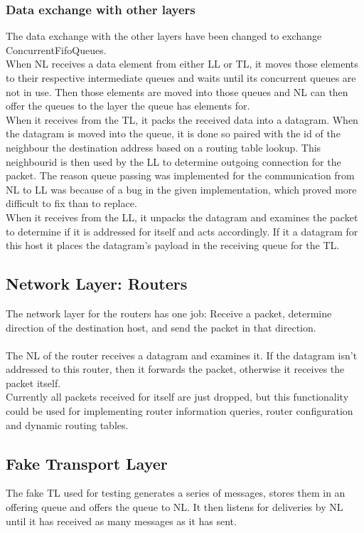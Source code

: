 \subsubsection{Data exchange with other layers}
The data exchange with the other layers have been changed to exchange ConcurrentFifoQueues.\\
When NL receives a data element from either LL or TL, it moves those elements to their respective intermediate queues and waits until its concurrent queues are not in use. Then those elements are moved into those queues and NL can then offer the queues to the layer the queue has elements for.\\
When it receives from the TL, it packs the received data into a datagram. When the datagram is moved into the queue, it is done so paired with the id of the neighbour the destination address based on a routing table lookup. This neighbourid is then used by the LL to determine outgoing connection for the packet. The reason queue passing was implemented for the communication from NL to LL was because of a bug in the given implementation, which proved more difficult to fix than to replace.\\
When it receives from the LL, it unpacks the datagram and examines the packet to determine if it is addressed for itself and acts accordingly. If it a datagram for this host it places the datagram's payload in the receiving queue for the TL.\\

\subsection{Network Layer: Routers}
\label{sec:NLRouters}
The network layer for the routers has one job: Receive a packet, determine direction of the destination host, and send the packet in that direction.\\
\\
The NL of the router receives a datagram and examines it. If the datagram isn't addressed to this router, then it forwards the packet, otherwise it receives the packet itself.\\
Currently all packets received for itself are just dropped, but this functionality could be used for implementing router information queries, router configuration and dynamic routing tables.

\subsection{Fake Transport Layer}
The fake TL used for testing generates a series of messages, stores them in an offering queue and offers the queue to NL. It then listens for deliveries by NL until it has received as many messages as it has sent.

